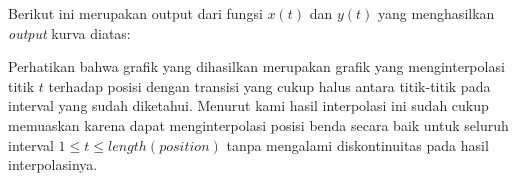 \documentclass[journal,12pt,onecolumn,a4paper]{IEEEtran}
\begin{document}
Berikut ini merupakan output dari fungsi \(x(t)\) dan \(y(t)\) yang menghasilkan \emph{output} kurva diatas:
Perhatikan bahwa grafik yang dihasilkan merupakan grafik yang menginterpolasi titik \(t\) terhadap posisi dengan transisi yang cukup halus antara titik-titik pada interval yang sudah diketahui. Menurut kami hasil interpolasi ini sudah cukup memuaskan karena dapat menginterpolasi posisi benda secara baik untuk seluruh interval \(1 \leq t \leq length(position)\) tanpa mengalami diskontinuitas pada hasil interpolasinya.
\end{document}
